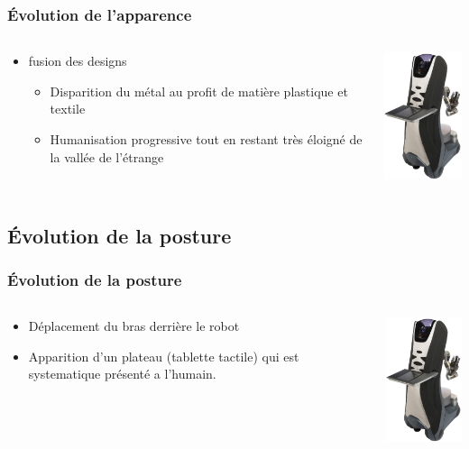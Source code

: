 \begin{frame}
  \frametitle{\'Evolution de l'apparence}
  \begin{columns}[T]
    \begin{column}{.5\textwidth}
      \begin{itemize}
      \item fusion des designs
        \begin{itemize}
        \item Disparition du métal au profit de matière plastique et textile
        \item Humanisation progressive tout en restant très éloigné de
          la vallée de l'étrange
        \end{itemize}
      \end{itemize}
    \end{column}
    \begin{column}{.5\textwidth}
      \includegraphics[width=3cm]{image/Care_o_bot_3.jpg}
    \end{column}
  \end{columns}
\end{frame}

\subsection{\'Evolution de la posture}

\begin{frame}
\frametitle{\'Evolution de la posture}
  \begin{columns}[T]
    \begin{column}{.5\textwidth}
      \begin{itemize}
      \item Déplacement du bras derrière le robot
      \item Apparition d'un plateau (tablette tactile) qui est 
        systematique présenté a l'humain.
      \end{itemize}
    \end{column}
    \begin{column}{.5\textwidth}
      \includegraphics[width=3cm]{image/Care_o_bot_3.jpg}
    \end{column}
  \end{columns}
\end{frame}
